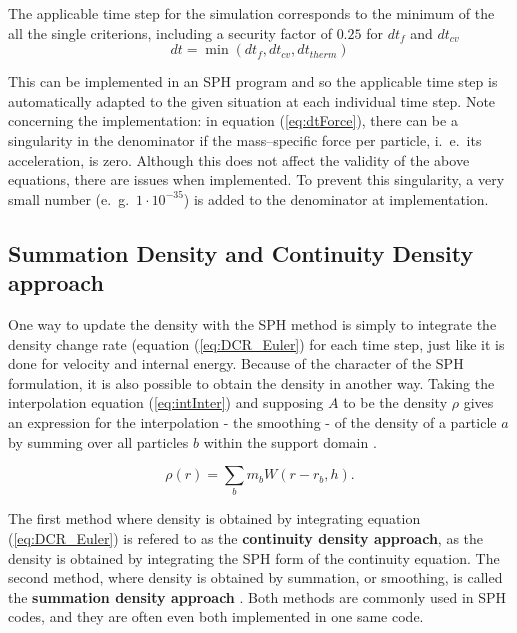 \documentclass{report}
\begin{document}

The applicable time step for the simulation corresponds to the minimum of the all the single criterions, including a security factor of $0.25$ for $dt_f$ and $dt_{cv}$ 
\begin{equation}
\label{eq:dt}
dt=\min(dt_f,dt_{cv},dt_\mathit{therm})
\end{equation}

This can be implemented in an SPH program and so the applicable time step is automatically adapted to the given situation at each individual time step. 
Note concerning the implementation: in equation (\ref{eq:dtForce}), there can be a singularity in the denominator if the mass--specific force per particle, i.\ e.\ its acceleration, is zero. Although this does not affect the validity of the above equations, there are issues when implemented. To prevent this singularity, a very small number (e.\ g.\ $1\cdot 10^{-35}$) is added to the denominator at implementation.





\subsection{Summation Density and Continuity Density approach}
\label{sec:DensCalcMode}
One way to update the density with the SPH method is simply to integrate the density 
change rate (equation (\ref{eq:DCR_Euler}) for each time step, just like it is done for velocity 
and internal energy. Because of the character of the SPH formulation, it is also  
possible to obtain the density in another way. Taking the interpolation equation 
(\ref{eq:intInter}) and supposing $A$ to be the density $\rho$ gives an expression for 
the interpolation - the smoothing - of the density of a particle $a$ by summing over 
all particles $b$ within the support domain \cite{Monaghan2005}.

\begin{equation}
\label{eq:SumDensity}
\rho(r)=\sum_b m_b W(r-r_b,h).
\end{equation}

The first method where density is obtained by integrating equation (\ref{eq:DCR_Euler}) is refered 
to as the {\bf continuity density approach}, as the density is obtained by integrating the SPH form of the continuity equation. The second method, where density is obtained by 
summation, or smoothing, is called the {\bf summation density approach} \cite{Liu2003}. 
Both methods are commonly used in SPH codes, and they are often even both implemented 
in one same code. 
\end{document}
